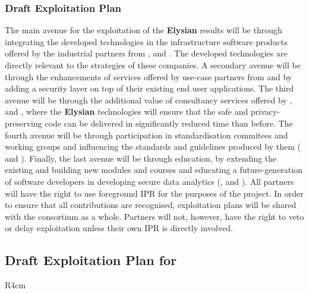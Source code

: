 \documentclass[a4paper,11pt]{article}
\newcommand{\project}[1]{\textbf{#1}\xspace}
\newcommand{\SECURITY}{\project{Elysian}}
\newcommand{\TheProject}{\SECURITY}
\begin{document}

\subsubsection{Draft Exploitation Plan}
\label{sect:exploitation-plan}
\vspace{-12pt}
The main avenue for the exploitation of the \TheProject{} results will be through integrating the developed technologies in the infrastructure software products offered by the industrial partners from \IBMshort{}, \YAGshort{} and \COGNIshort{}. The developed technologies are directly relevant to the strategies of these companies. A secondary avenue will be through the enhancements of services offered by use-case partners from \SOPRAshort{} and \FRQshort{} by adding a security layer on top of their existing end user applications. The third avenue will be through the additional value of consultancy services offered by \SOPRAshort{}, \SCCHshort{} and \UODshort{}, where the \TheProject{} technologies will ensure that the safe and privacy-preserving code can be delivered in significantly reduced time than before. The fourth avenue will be through participation in standardisation commitees and working groups and influencing the standards and guidelines produced by them (\UCMshort{} and \FRQshort{}). Finally, the last avenue will be through education, by extending the existing and building new modules and courses and educating a future-generation of software developers in developing secure data analytics (\SAshort{}, \UODshort{} and \UCMshort{}). All partners will have the right to use foreground IPR for the purposes of the project. In order to ensure that all contributions are recognised, exploitation plans will be shared with the consortium as a whole. Partners will not, however, have the right to veto or delay exploitation unless their own IPR is directly involved.


\horizontalline

\subsection*{Draft Exploitation Plan for \IBMshort{}}

\begin{wrapfigure}{R}{4cm}
\vspace{-1.4cm}
\hfill {}
\vspace{-0.6cm}
\end{wrapfigure}
\end{document}
